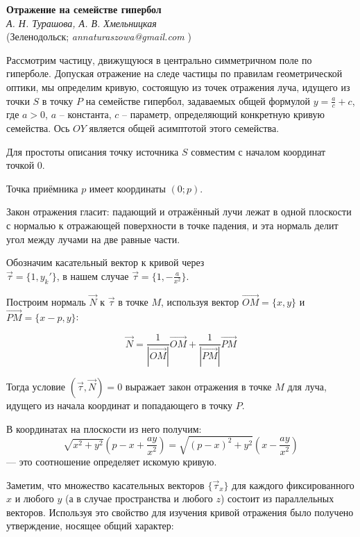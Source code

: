 \documentclass[a5paper,12pt,openbib]{report}
\begin{document}

\begin{center}{ \bf Отражение на семействе гипербол}\\
{\it А. Н. Турашова, А. В. Хмельницкая} \\
(Зеленодольск; {\it annaturaszowa@gmail.com} )
\end{center}

Рассмотрим частицу, движущуюся в центрально симметричном поле по гиперболе. Допуская отражение на следе частицы по правилам геометрической оптики, мы определим кривую, состоящую из точек отражения луча, идущего из точки $S$ в точку $P$ на семействе гипербол, задаваемых общей формулой $y= \frac ac + c$, где $a > 0$, $a$ – константа, $c$ – параметр, определяющий конкретную кривую семейства. Ось $OY$ является общей асимптотой этого семейства.

Для простоты описания точку источника $S$ совместим с началом координат точкой $0$.

Точка приёмника $p$ имеет координаты $(0;p)$.

Закон отражения гласит: падающий и отражённый лучи лежат в одной плоскости с нормалью к отражающей поверхности в точке падения, и эта нормаль делит угол между лучами на две равные части.

Обозначим касательный вектор к кривой через \\ $\vec \tau = \{ 1, y_k' \}$, в нашем случае $\vec \tau = \{ 1,- \frac{a}{x^2} \}$.

Построим нормаль $\vec N$ к $\vec \tau$ в точке $M$, используя вектор $\overrightarrow{OM}=\{x,y\}$ и $\overrightarrow{PM}=\{x-p,y\}$:

$$ \vec{N}=\frac{1}{|\overrightarrow{OM}|}\overrightarrow{OM}+\frac{1}{|\overrightarrow{PM}|}\overrightarrow{PM} $$

Тогда условие $(\vec \tau , \vec N)=0$ выражает закон отражения в точке $M$ для луча, идущего из начала координат и попадающего в точку $P$.

В координатах на плоскости из него получим:
\[
\sqrt{x^2+y^2}
\left( p-x+ \frac{ay}{x^2} \right)
=
\sqrt{{(p-x)}^2+y^2} 
\left( x - \frac{ay}{x^2} \right)
\]
    --- это соотношение определяет искомую кривую. 

Заметим, что множество касательных векторов $\{ \vec \tau_x \}$ для каждого фиксированного $x$ и любого $y$ (а в случае пространства и любого $z$) состоит из параллельных векторов. Используя это свойство для изучения кривой отражения было получено утверждение, носящее общий характер:
\end{document}
